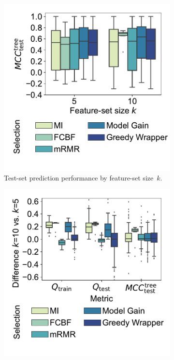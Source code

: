 \documentclass{article}
\theoremstyle{definition}
\begin{document}
\begin{figure}[t]
	\centering
	\begin{subfigure}[t]{0.48\textwidth}
		\centering
		\includegraphics[width=\textwidth, trim=15 35 5 15, clip]{plots/afs-impact-fs-method-k-decision-tree-test-mcc.pdf}
		\caption{Test-set prediction performance by feature-set size~$k$.}
		\label{fig:afs:impact-fs-method-k-decision-tree-test-mcc}
	\end{subfigure}
	\hfill
	\begin{subfigure}[t]{0.48\textwidth}
		\centering
		\includegraphics[width=\textwidth, trim=15 35 5 15, clip]{plots/afs-impact-fs-method-k-metric-diff.pdf}

\end{subfigure}
\end{figure}
\end{document}
